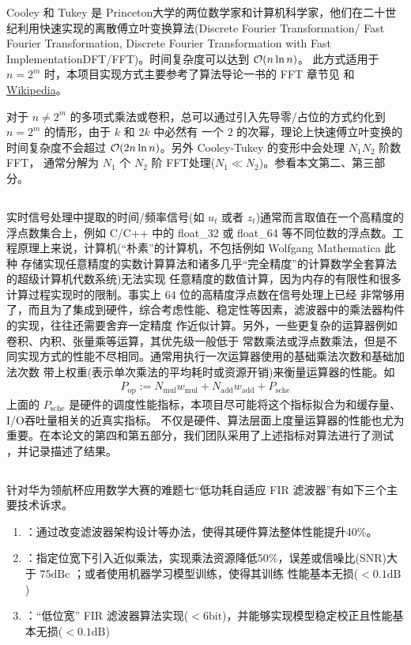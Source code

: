 Cooley 和 Tukey 是 Princeton大学的两位数学家和计算机科学家，他们在二十世纪利用快速实现的离散傅立叶变换算法(Discrete Fourier Transformation/ Fast Fourier Transformation, Discrete
 Fourier Transformation with Fast ImplementationDFT/FFT)。时间复杂度可以达到 $\mathcal{O} (n \ln n )$。
此方式适用于 $n= 2^m$ 时，本项目实现方式主要参考了算法导论一书的 FFT 章节见
 \cite[Polynomials and FFT]{Cormen2022} 和 \href{https://en.wikipedia.org/wiki/Fast_Fourier_transform}{Wikipedia}。

对于 $n \not= 2^m$ 的多项式乘法或卷积，总可以通过引入先导零/占位的方式约化到 $n = 2^m$ 的情形，由于 $k$ 和 $2k$ 中必然有
一个 $2$ 的次幂，理论上快速傅立叶变换的时间复杂度不会超过 $\mathcal{O} (2n \ln n)$。另外 Cooley-Tukey 的变形中会处理 $N_1 N_2$ 阶数 FFT，
通常分解为 $N_1$ 个 $N_2$ 阶 FFT处理($N_1 \ll N_2$)。参看本文第二、第三部分。

\subsection{}
实时信号处理中提取的时间/频率信号(如 $u_t$ 或者 $z_t$)通常而言取值在一个高精度的浮点数集合上，例如
C/C++ 中的 float\_32 或 float\_64 等不同位数的浮点数。工程原理上来说，计算机(``朴素''的计算机，不包括例如 Wolfgang Mathematica 此种
存储实现任意精度的实数计算算法和诸多几乎``完全精度''的计算数学全套算法的超级计算机代数系统)无法实现
任意精度的数值计算，因为内存的有限性和很多计算过程实现时的限制。事实上 $64$ 位的高精度浮点数在信号处理上已经
非常够用了，而且为了集成到硬件，综合考虑性能、稳定性等因素，滤波器中的乘法器构件的实现，往往还需要舍弃一定精度
作近似计算。另外，一些更复杂的运算器例如卷积、内积、张量乘等运算，其优先级一般低于
常数乘法或浮点数乘法，但是不同实现方式的性能不尽相同。通常用执行一次运算器使用的基础乘法次数和基础加法次数
带上权重(表示单次乘法的平均耗时或资源开销)来衡量运算器的性能。如
\begin{eqnarray*}
    P_{\mathrm{op}} := N_{\mathrm{mul}} w_{\mathrm{mul}} + N_{\mathrm{add}} w_{\mathrm{add}} + P_{\mathrm{sche}}
\end{eqnarray*}
上面的 $P_{\mathrm{sche}}$ 是硬件的调度性能指标，本项目尽可能将这个指标拟合为和缓存量、I/O吞吐量相关的近真实指标。
不仅是硬件、算法层面上度量运算器的性能也尤为重要。在本论文的第四和第五部分，我们团队采用了上述指标对算法进行了测试
，并记录描述了结果。

\subsection{}
针对华为领航杯应用数学大赛的难题七``低功耗自适应 FIR 滤波器''有如下三个主要技术诉求。
\begin{enumerate}
    \item {}：通过改变滤波器架构设计等办法，使得其硬件算法整体性能提升40\%。
    \item {}：指定位宽下引入近似乘法，实现乘法资源降低50\%，误差或信噪比(SNR)大于 $75 \mathrm{dBc}$
            ；或者使用机器学习模型训练，使得其训练
            性能基本无损($< 0.1 \mathrm{dB}$)
    \item {}：``低位宽'' FIR 滤波器算法实现($< 6 \mathrm{bit}$)，并能够实现模型稳定校正且性能基本无损($< 0.1 \mathrm{dB}$)
\end{enumerate}

